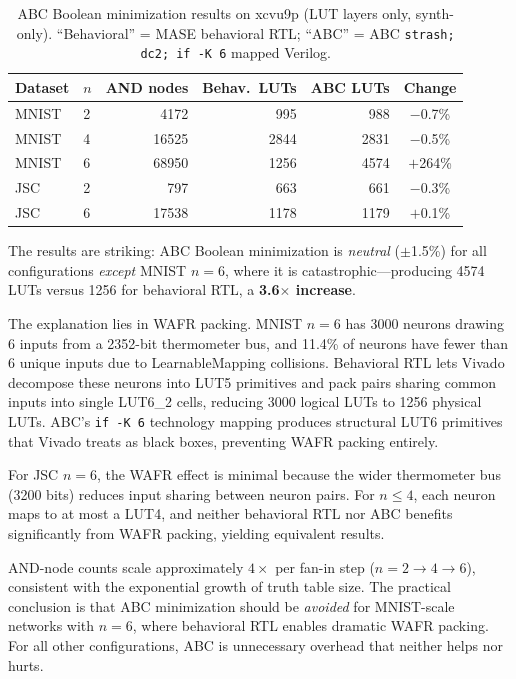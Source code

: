 \documentclass[conference]{IEEEtran}
\begin{document}
\begin{table}[t]
\centering
\caption{ABC Boolean minimization results on xcvu9p (LUT layers only, synth-only). ``Behavioral'' = MASE behavioral RTL; ``ABC'' = ABC \texttt{strash; dc2; if -K 6} mapped Verilog.}
\label{tab:abc}
\begin{tabular}{@{}llrrrc@{}}
\toprule
\textbf{Dataset} & \textbf{$n$} & \textbf{AND nodes} & \textbf{Behav.\ LUTs} & \textbf{ABC LUTs} & \textbf{Change} \\
\midrule
MNIST & 2 & \num{4172}  & \num{995}   & \num{988}   & $-$0.7\%  \\
MNIST & 4 & \num{16525} & \num{2844}  & \num{2831}  & $-$0.5\%  \\
MNIST & 6 & \num{68950} & \num{1256}  & \num{4574}  & $+$264\%  \\
JSC   & 2 & \num{797}   & \num{663}   & \num{661}   & $-$0.3\%  \\
JSC   & 6 & \num{17538} & \num{1178}  & \num{1179}  & $+$0.1\%  \\
\bottomrule
\end{tabular}
\end{table}

The results are striking: ABC Boolean minimization is \emph{neutral} ($\pm$1.5\%) for all configurations \emph{except} MNIST $n{=}6$, where it is catastrophic---producing \num{4574} LUTs versus \num{1256} for behavioral RTL, a \textbf{3.6$\times$ increase}.

The explanation lies in WAFR packing.
MNIST $n{=}6$ has \num{3000} neurons drawing 6 inputs from a \num{2352}-bit thermometer bus, and 11.4\% of neurons have fewer than 6 unique inputs due to LearnableMapping collisions.
Behavioral RTL lets Vivado decompose these neurons into LUT5 primitives and pack pairs sharing common inputs into single LUT6\_2 cells, reducing \num{3000} logical LUTs to \num{1256} physical LUTs.
ABC's \texttt{if -K 6} technology mapping produces structural LUT6 primitives that Vivado treats as black boxes, preventing WAFR packing entirely.

For JSC $n{=}6$, the WAFR effect is minimal because the wider thermometer bus (\num{3200} bits) reduces input sharing between neuron pairs.
For $n \leq 4$, each neuron maps to at most a LUT4, and neither behavioral RTL nor ABC benefits significantly from WAFR packing, yielding equivalent results.

AND-node counts scale approximately $4\times$ per fan-in step ($n{=}2 \to 4 \to 6$), consistent with the exponential growth of truth table size.
The practical conclusion is that ABC minimization should be \emph{avoided} for MNIST-scale networks with $n{=}6$, where behavioral RTL enables dramatic WAFR packing.
For all other configurations, ABC is unnecessary overhead that neither helps nor hurts.
\end{document}
